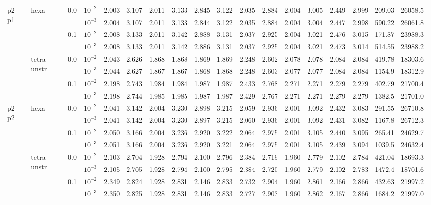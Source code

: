 \begin{longtable}{llclrrrrrrrrrrrrrr}
\multirow{8}{*}{p2--p1} & \multirow{4}{*}{hexa} & \multirow{2}{*}{0.0} & $10^{-2}$ & 2.003 & 3.107 & 2.011 & 3.133 & 2.845 & 3.122 & 2.035 & 2.884 & 2.004 & 3.005 & 2.449 & 2.999 & 209.03 & 26058.5 \\
& & & $10^{-3}$ & 2.004 & 3.107 & 2.011 & 3.133 & 2.844 & 3.122 & 2.035 & 2.884 & 2.004 & 3.004 & 2.447 & 2.998 & 590.22 & 26061.8 \\\cline{3-18}
& & \multirow{2}{*}{0.1} & $10^{-2}$ & 2.008 & 3.133 & 2.011 & 3.142 & 2.888 & 3.131 & 2.037 & 2.925 & 2.004 & 3.021 & 2.476 & 3.015 & 171.87 & 23988.3 \\
& & & $10^{-3}$ & 2.008 & 3.133 & 2.011 & 3.142 & 2.886 & 3.131 & 2.037 & 2.925 & 2.004 & 3.021 & 2.473 & 3.014 & 514.55 & 23988.2 \\\cline{2-18}
& \multirow{4}{*}{tetra unstr} & \multirow{2}{*}{0.0} & $10^{-2}$ & 2.043 & 2.626 & 1.868 & 1.868 & 1.869 & 1.869 & 2.248 & 2.602 & 2.078 & 2.078 & 2.084 & 2.084 & 419.78 & 18303.6 \\
& & & $10^{-3}$ & 2.044 & 2.627 & 1.867 & 1.867 & 1.868 & 1.868 & 2.248 & 2.603 & 2.077 & 2.077 & 2.084 & 2.084 & 1154.9 & 18312.9 \\\cline{3-18}
& & \multirow{2}{*}{0.1} & $10^{-2}$ & 2.198 & 2.743 & 1.984 & 1.984 & 1.987 & 1.987 & 2.433 & 2.768 & 2.271 & 2.271 & 2.279 & 2.279 & 402.79 & 21700.4 \\
& & & $10^{-3}$ & 2.198 & 2.744 & 1.985 & 1.985 & 1.987 & 1.987 & 2.429 & 2.767 & 2.271 & 2.271 & 2.279 & 2.279 & 1382.5 & 21701.0 \\\hline

\multirow{8}{*}{p2--p2} & \multirow{4}{*}{hexa} & \multirow{2}{*}{0.0} & $10^{-2}$ & 2.041 & 3.142 & 2.004 & 3.230 & 2.898 & 3.215 & 2.059 & 2.936 & 2.001 & 3.092 & 2.432 & 3.083 & 291.55 & 26710.8 \\
& & & $10^{-3}$ & 2.041 & 3.142 & 2.004 & 3.230 & 2.897 & 3.215 & 2.060 & 2.936 & 2.001 & 3.092 & 2.431 & 3.082 & 1167.8 & 26712.3 \\\cline{3-18}
& & \multirow{2}{*}{0.1} & $10^{-2}$ & 2.050 & 3.166 & 2.004 & 3.236 & 2.920 & 3.222 & 2.064 & 2.975 & 2.001 & 3.105 & 2.440 & 3.095 & 265.41 & 24629.7 \\
& & & $10^{-3}$ & 2.051 & 3.166 & 2.004 & 3.236 & 2.920 & 3.221 & 2.064 & 2.975 & 2.001 & 3.105 & 2.439 & 3.094 & 1039.5 & 24632.4 \\\cline{2-18}
& \multirow{4}{*}{tetra unstr} & \multirow{2}{*}{0.0} & $10^{-2}$ & 2.103 & 2.704 & 1.928 & 2.794 & 2.100 & 2.796 & 2.384 & 2.719 & 1.960 & 2.779 & 2.102 & 2.784 & 421.04 & 18693.3 \\
& & & $10^{-3}$ & 2.105 & 2.705 & 1.928 & 2.794 & 2.100 & 2.795 & 2.384 & 2.720 & 1.960 & 2.779 & 2.102 & 2.783 & 1472.4 & 18701.6 \\\cline{3-18}
& & \multirow{2}{*}{0.1} & $10^{-2}$ & 2.349 & 2.824 & 1.928 & 2.831 & 2.146 & 2.833 & 2.732 & 2.904 & 1.960 & 2.861 & 2.166 & 2.866 & 432.63 & 21997.2 \\
& & & $10^{-3}$ & 2.350 & 2.825 & 1.928 & 2.831 & 2.146 & 2.833 & 2.727 & 2.903 & 1.960 & 2.862 & 2.167 & 2.866 & 1684.2 & 21997.0 \\\hline


\end{longtable}
